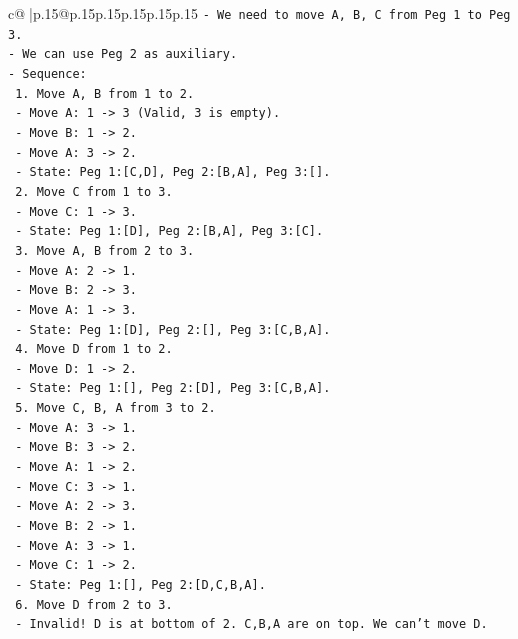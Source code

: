 \documentclass{article}
\begin{document}
{\begin{supertabular}{c@{$\;$}|p{.15\linewidth}@{}p{.15\linewidth}p{.15\linewidth}p{.15\linewidth}p{.15\linewidth}p{.15\linewidth}}
{{{\texttt{{-} We need to move A, B, C from Peg 1 to Peg 3.} \\
\texttt{{-} We can use Peg 2 as auxiliary.} \\
\texttt{{-} Sequence:} \\
\texttt{  1. Move A, B from 1 to 2.} \\
\texttt{     {-} Move A: 1 {-}> 3 (Valid, 3 is empty).} \\
\texttt{     {-} Move B: 1 {-}> 2.} \\
\texttt{     {-} Move A: 3 {-}> 2.} \\
\texttt{     {-} State: Peg 1:{[}C,D{]}, Peg 2:{[}B,A{]}, Peg 3:{[}{]}.} \\
\texttt{  2. Move C from 1 to 3.} \\
\texttt{     {-} Move C: 1 {-}> 3.} \\
\texttt{     {-} State: Peg 1:{[}D{]}, Peg 2:{[}B,A{]}, Peg 3:{[}C{]}.} \\
\texttt{  3. Move A, B from 2 to 3.} \\
\texttt{     {-} Move A: 2 {-}> 1.} \\
\texttt{     {-} Move B: 2 {-}> 3.} \\
\texttt{     {-} Move A: 1 {-}> 3.} \\
\texttt{     {-} State: Peg 1:{[}D{]}, Peg 2:{[}{]}, Peg 3:{[}C,B,A{]}.} \\
\texttt{  4. Move D from 1 to 2.} \\
\texttt{     {-} Move D: 1 {-}> 2.} \\
\texttt{     {-} State: Peg 1:{[}{]}, Peg 2:{[}D{]}, Peg 3:{[}C,B,A{]}.} \\
\texttt{  5. Move C, B, A from 3 to 2.} \\
\texttt{     {-} Move A: 3 {-}> 1.} \\
\texttt{     {-} Move B: 3 {-}> 2.} \\
\texttt{     {-} Move A: 1 {-}> 2.} \\
\texttt{     {-} Move C: 3 {-}> 1.} \\
\texttt{     {-} Move A: 2 {-}> 3.} \\
\texttt{     {-} Move B: 2 {-}> 1.} \\
\texttt{     {-} Move A: 3 {-}> 1.} \\
\texttt{     {-} Move C: 1 {-}> 2.} \\
\texttt{     {-} State: Peg 1:{[}{]}, Peg 2:{[}D,C,B,A{]}.} \\
\texttt{  6. Move D from 2 to 3.} \\
\texttt{     {-} Invalid! D is at bottom of 2. C,B,A are on top. We can't move D.} \\
}}}
\end{supertabular}}
\end{document}
